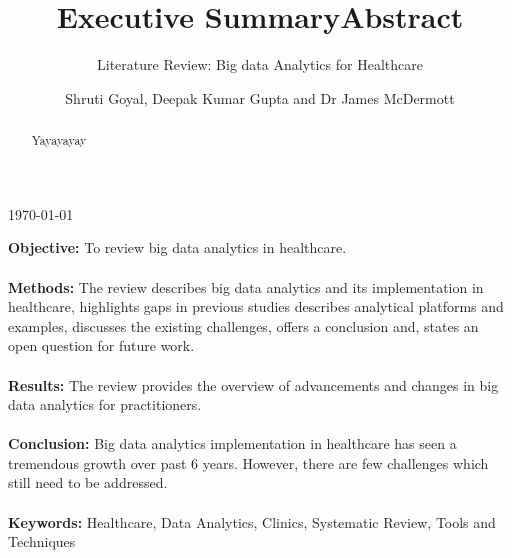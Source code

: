 \documentclass[paper=a4, fontsize=11pt]{scrartcl} %
\begin{document}
\begin{titlepage}
\vspace{3cm}
{\large \today}\\[1cm] %
\vfill %
\end{titlepage}



\tableofcontents
\listoffigures
\listoftables
{}
\cleardoublepage
\clearpage

\subtitle{\normalsize{Literature Review: Big data Analytics for Healthcare}}
\title{Executive Summary}
\author{\small{Shruti Goyal, Deepak Kumar Gupta and Dr James McDermott}}
\date{}
\maketitle
\textbf{Objective:} To review big data analytics in healthcare.
\\
\\
\textbf{Methods:} The review describes big data analytics and its implementation in healthcare, highlights gaps in previous studies describes analytical platforms and examples, discusses the existing challenges, offers a conclusion and, states an open question for future work.
\\
\\
\textbf{Results:} The review provides the overview of advancements and changes in big data analytics for 
practitioners.
\\
\\
\textbf{Conclusion:} Big data analytics implementation in healthcare has seen a tremendous growth over past 6 years. However, there are few challenges which still need to be addressed.
\\ 
\\
\textbf{Keywords:} Healthcare, Data Analytics, Clinics, Systematic Review, Tools and Techniques
\clearpage	
\begin{abstract}
\title{Abstract}
Yayayayay
\end{abstract}
\newpage 
{}
\end{document}
